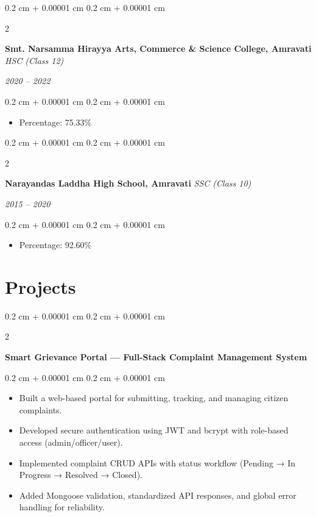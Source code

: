 \documentclass[10pt, letterpaper]{article}
\newenvironment{highlights}{
    \begin{itemize}[
        topsep=0.10 cm,
        parsep=0.10 cm,
        partopsep=0pt,
        itemsep=0pt,
        leftmargin=0.4 cm + 10pt
    ]
}{
    \end{itemize}
} %
\newenvironment{onecolentry}{
    \begin{adjustwidth}{
        0.2 cm + 0.00001 cm
    }{
        0.2 cm + 0.00001 cm
    }
}{
    \end{adjustwidth}
} %
\newenvironment{twocolentry}[2][]{
    \onecolentry
    \def\secondColumn{#2}
    \setcolumnwidth{\fill, 4.5 cm}
    \begin{paracol}{2}
}{
    \switchcolumn \raggedleft \secondColumn
    \end{paracol}
    \endonecolentry
} %
\begin{document}
\vspace{0.2 cm - 0.2 cm}

\begin{twocolentry}{\textit{2020 – 2022}}
    \textbf{Smt. Narsamma Hirayya Arts, Commerce \& Science College, Amravati}
    \textit{HSC (Class 12)}
\end{twocolentry}

\vspace{0.10 cm}
\begin{onecolentry}
    \begin{highlights}
        \item Percentage: 75.33\%
    \end{highlights}
\end{onecolentry}

\vspace{0.2 cm - 0.2 cm}

\begin{twocolentry}{\textit{2015 – 2020}}
    \textbf{Narayandas Laddha High School, Amravati}
    \textit{SSC (Class 10)}
\end{twocolentry}

\vspace{0.10 cm}
\begin{onecolentry}
    \begin{highlights}
        \item Percentage: 92.60\%
    \end{highlights}
\end{onecolentry}

\section{Projects}

\begin{twocolentry}{}
    \textbf{Smart Grievance Portal — Full-Stack Complaint Management System}
\end{twocolentry}

\vspace{0.10 cm}
\begin{onecolentry}
    \begin{highlights}
        \item Built a web-based portal for submitting, tracking, and managing citizen complaints.
        \item Developed secure authentication using JWT and bcrypt with role-based access (admin/officer/user).
        \item Implemented complaint CRUD APIs with status workflow (Pending → In Progress → Resolved → Closed).
        \item Added Mongoose validation, standardized API responses, and global error handling for reliability.
    \end{highlights}
\end{onecolentry}
\end{document}
